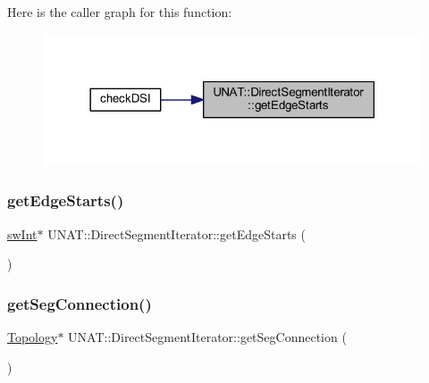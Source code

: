 Here is the caller graph for this function\+:
\nopagebreak
\begin{figure}[H]
\begin{center}
\leavevmode
\includegraphics[width=318pt]{classUNAT_1_1DirectSegmentIterator_afd25b37163568da6c2982bd766d346af_icgraph}
\end{center}
\end{figure}
\mbox{\label{classUNAT_1_1DirectSegmentIterator_afd25b37163568da6c2982bd766d346af}} 
\subsubsection{\texorpdfstring{getEdgeStarts()}{getEdgeStarts()}\hspace{0.1cm}{\footnotesize\ttfamily [2/2]}}
{\footnotesize\ttfamily \mbox{\hyperlink{include_2swMacro_8h_a113cf5f6b5377cdf3fac6aa4e443e9aa}{sw\+Int}}$\ast$ U\+N\+A\+T\+::\+Direct\+Segment\+Iterator\+::get\+Edge\+Starts (\begin{DoxyParamCaption}{ }\end{DoxyParamCaption})\hspace{0.3cm}{\ttfamily [inline]}}

\mbox{\label{classUNAT_1_1DirectSegmentIterator_aeddd507138479b1dad08053dd342bffb}} 
\subsubsection{\texorpdfstring{getSegConnection()}{getSegConnection()}\hspace{0.1cm}{\footnotesize\ttfamily [1/2]}}
{\footnotesize\ttfamily \mbox{\hyperlink{classUNAT_1_1Topology}{Topology}}$\ast$ U\+N\+A\+T\+::\+Direct\+Segment\+Iterator\+::get\+Seg\+Connection (\begin{DoxyParamCaption}{ }\end{DoxyParamCaption})\hspace{0.3cm}{\ttfamily [inline]}}

